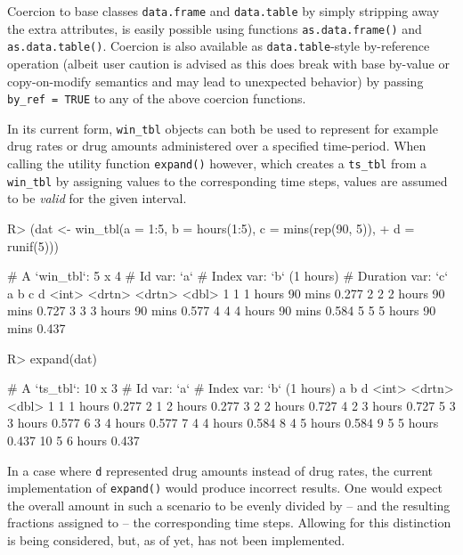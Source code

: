 \documentclass[
  notitle]{jss}
\begin{document}
Coercion to base classes \texttt{data.frame} and \texttt{data.table} by
simply stripping away the extra attributes, is easily possible using
functions \texttt{as.data.frame()} and \texttt{as.data.table()}.
Coercion is also available as \texttt{data.table}-style by-reference
operation (albeit user caution is advised as this does break with base
 by-value or copy-on-modify semantics and may lead to
unexpected behavior) by passing \texttt{by\_ref\ =\ TRUE} to any of the
above coercion functions.

In its current form, \texttt{win\_tbl} objects can both be used to
represent for example drug rates or drug amounts administered over a
specified time-period. When calling the utility function
\texttt{expand()} however, which creates a \texttt{ts\_tbl} from a
\texttt{win\_tbl} by assigning values to the corresponding time steps,
values are assumed to be \emph{valid} for the given interval.

\begin{CodeChunk}
\begin{CodeInput}
R> (dat <- win_tbl(a = 1:5, b = hours(1:5), c = mins(rep(90, 5)),
+                 d = runif(5)))
\end{CodeInput}
\begin{CodeOutput}
# A `win_tbl`:  5 x 4
# Id var:       `a`
# Index var:    `b` (1 hours)
# Duration var: `c`
      a b       c           d
  <int> <drtn>  <drtn>  <dbl>
1     1 1 hours 90 mins 0.277
2     2 2 hours 90 mins 0.727
3     3 3 hours 90 mins 0.577
4     4 4 hours 90 mins 0.584
5     5 5 hours 90 mins 0.437
\end{CodeOutput}
\begin{CodeInput}
R> expand(dat)
\end{CodeInput}
\begin{CodeOutput}
# A `ts_tbl`: 10 x 3
# Id var:     `a`
# Index var:  `b` (1 hours)
       a b           d
   <int> <drtn>  <dbl>
 1     1 1 hours 0.277
 2     1 2 hours 0.277
 3     2 2 hours 0.727
 4     2 3 hours 0.727
 5     3 3 hours 0.577
 6     3 4 hours 0.577
 7     4 4 hours 0.584
 8     4 5 hours 0.584
 9     5 5 hours 0.437
10     5 6 hours 0.437
\end{CodeOutput}
\end{CodeChunk}

In a case where \texttt{d} represented drug amounts instead of drug
rates, the current implementation of \texttt{expand()} would produce
incorrect results. One would expect the overall amount in such a
scenario to be evenly divided by -- and the resulting fractions assigned
to -- the corresponding time steps. Allowing for this distinction is
being considered, but, as of yet, has not been implemented.
\end{document}

